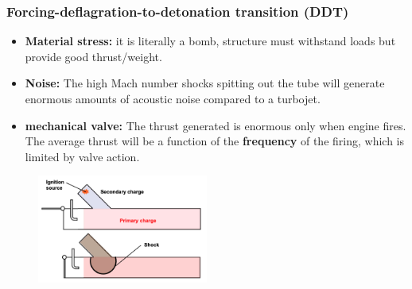 \documentclass[a4paper,10pt]{article}
\begin{document}
\subsubsection*{Forcing-deflagration-to-detonation transition (DDT)}
\begin{multicols}{2}
    \begin{itemize}
        \item \textbf{Material stress:} it is literally a bomb, structure must withstand loads but provide good thrust/weight.
        \item \textbf{Noise:} The high Mach number shocks spitting out the tube will generate enormous amounts of acoustic noise compared to a turbojet. 
        \item \textbf{mechanical valve:} The thrust generated is enormous only when engine fires. The average thrust will be a function of the \textbf{frequency} of the firing, which is limited by valve action. 
    \end{itemize}
    \begin{figure}[H]
        \centering
        \includegraphics[width=0.5\textwidth]{Figure/DDT.png}
    \end{figure}
\end{multicols}
\end{document}
